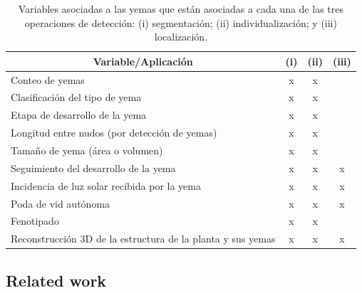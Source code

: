 \documentclass[a4paper,authoryear,review]{elsarticle}
\begin{document}
\begin{table}[]
	\begin{tabular}{lccl}
		\hline
		\multicolumn{1}{c}{\textbf{Variable/Aplicación}} & \textbf{(i)} & \textbf{(ii)} & \multicolumn{1}{c}{\textbf{(iii)}} \\ \hline
		Conteo de yemas & x & x &  \\
		Clasificación del tipo de yema & x & x &  \\
		Etapa de desarrollo de la yema & x & x &  \\
		Longitud entre nudos (por detección de yemas) & x & x &  \\
		Tamaño de yema (área o volumen) & x & x &  \\
		Seguimiento del desarrollo de la yema & x & x & \multicolumn{1}{c}{x} \\
		Incidencia de luz solar recibida por la yema & x & x & \multicolumn{1}{c}{x} \\
		Poda de vid autónoma & x & x & \multicolumn{1}{c}{x} \\
		Fenotipado & x & x &  \\
		Reconstrucción 3D de la estructura de la planta y sus yemas & x & x & \multicolumn{1}{c}{x} \\ \hline
	\end{tabular}
	\caption{Variables asociadas a las yemas que están asociadas a cada una de las tres operaciones de detección: (i) segmentación; (ii) individualización; y (iii) localización.}
	\label{tab:Tabla1}
\end{table}

\subsection{Related work}
\end{document}
